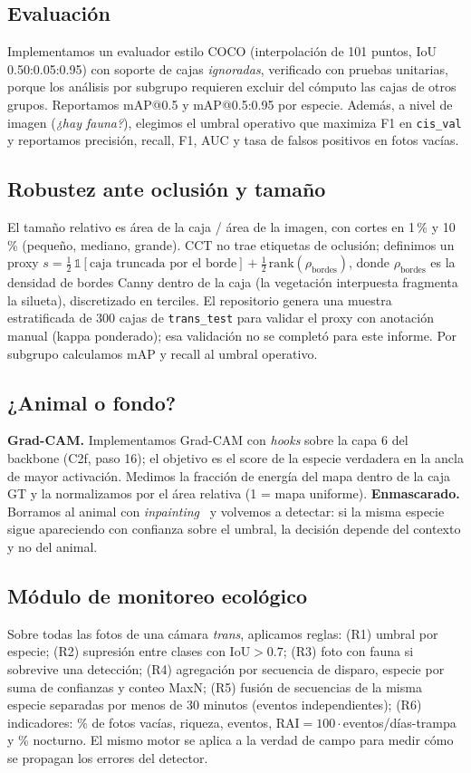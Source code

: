 \documentclass{article}
\begin{document}
\subsection{Evaluación}
Implementamos un evaluador estilo COCO (interpolación de 101 puntos, IoU 0.50:0.05:0.95) con soporte
de cajas \emph{ignoradas}, verificado con pruebas unitarias, porque los análisis por subgrupo
requieren excluir del cómputo las cajas de otros grupos. Reportamos mAP@0.5 y mAP@0.5:0.95 por
especie. Además, a nivel de imagen (\emph{¿hay fauna?}), elegimos el umbral operativo que maximiza
F1 en \texttt{cis\_val} y reportamos precisión, recall, F1, AUC y tasa de falsos positivos en fotos vacías.

\subsection{Robustez ante oclusión y tamaño}
El tamaño relativo es área de la caja / área de la imagen, con cortes en 1\,\% y 10\,\% (pequeño,
mediano, grande). CCT no trae etiquetas de oclusión; definimos un proxy
$s=\tfrac12\,\mathbb{1}[\text{caja truncada por el borde}]+\tfrac12\,\mathrm{rank}(\rho_{\text{bordes}})$,
donde $\rho_{\text{bordes}}$ es la densidad de bordes Canny dentro de la caja (la vegetación
interpuesta fragmenta la silueta), discretizado en terciles. El repositorio genera una muestra
estratificada de 300 cajas de \texttt{trans\_test} para validar el proxy con anotación manual
(kappa ponderado); esa validación no se completó para este informe. Por subgrupo calculamos mAP y
recall al umbral operativo.

\subsection{¿Animal o fondo?}
\textbf{Grad-CAM.} Implementamos Grad-CAM con \emph{hooks} sobre la capa 6 del backbone (C2f, paso 16);
el objetivo es el score de la especie verdadera en la ancla de mayor activación. Medimos la fracción de
energía del mapa dentro de la caja GT y la normalizamos por el área relativa (1 = mapa uniforme).
\textbf{Enmascarado.} Borramos al animal con \emph{inpainting}~\citep{telea2004inpainting} y volvemos a
detectar: si la misma especie sigue apareciendo con confianza sobre el umbral, la decisión depende
del contexto y no del animal.

\subsection{Módulo de monitoreo ecológico}
Sobre todas las fotos de una cámara \emph{trans}, aplicamos reglas: (R1) umbral por especie;
(R2) supresión entre clases con IoU$>0.7$; (R3) foto con fauna si sobrevive una detección;
(R4) agregación por secuencia de disparo, especie por suma de confianzas y conteo MaxN; (R5) fusión de
secuencias de la misma especie separadas por menos de 30 minutos (eventos independientes); (R6)
indicadores: \% de fotos vacías, riqueza, eventos, RAI$=100\cdot$eventos/días-trampa y \% nocturno.
El mismo motor se aplica a la verdad de campo para medir cómo se propagan los errores del detector.
\end{document}
